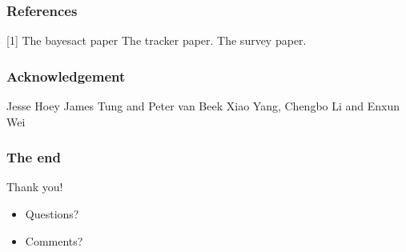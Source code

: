 \documentclass{beamer}
\begin{document}
\begin{frame}
\frametitle{References}
[1] The bayesact paper
\newline [2] The tracker paper.
\newline [3] The survey paper.
\end{frame}
\begin{frame}
\frametitle{Acknowledgement}
Jesse Hoey
\newline James Tung and Peter van Beek
\newline Xiao Yang, Chengbo Li and Enxun Wei
\end{frame}
\begin{frame}
\frametitle{The end}
\Huge{\centerline{Thank you!}}   
\fontsize{5mm}{4mm}
\begin{itemize}
\item Questions?
\item Comments?
\end{itemize}
\end{frame}

\end{document}
